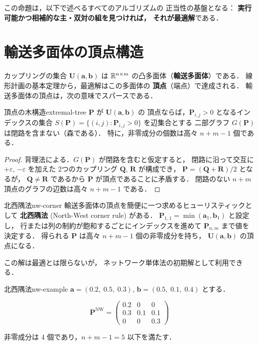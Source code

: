この命題は，以下で述べるすべてのアルゴリズムの
正当性の基盤となる：
\textbf{実行可能かつ相補的な主・双対の組を見つければ，
それが最適解}である．


\section{輸送多面体の頂点構造}\label{sec:transport-polytope}

カップリングの集合 $\mathbf{U}(\mathbf{a}, \mathbf{b})$ は
$\mathbb{R}^{n \times m}$ の凸多面体（\textbf{輸送多面体}）である．
線形計画の基本定理から，最適解はこの多面体の
\textbf{頂点}（端点）で達成される．
輸送多面体の頂点は，次の意味でスパースである．

\begin{proposition}{頂点の木構造}{extremal-tree}
$\mathbf{P}$ が $\mathbf{U}(\mathbf{a}, \mathbf{b})$ の
頂点ならば，$\mathbf{P}_{i,j} > 0$ となるインデックスの集合
$S(\mathbf{P}) = \{(i,j) : \mathbf{P}_{i,j} > 0\}$ を辺集合とする
二部グラフ $G(\mathbf{P})$ は閉路を含まない（森である）．
特に，非零成分の個数は高々 $n + m - 1$ 個である．
\end{proposition}

\begin{proof}
背理法による．$G(\mathbf{P})$ が閉路を含むと仮定すると，
閉路に沿って交互に $+\varepsilon$, $-\varepsilon$ を加えた
2つのカップリング $\mathbf{Q}$, $\mathbf{R}$ が構成でき，
$\mathbf{P} = (\mathbf{Q} + \mathbf{R})/2$ となるが，
$\mathbf{Q} \neq \mathbf{R}$ であるから
$\mathbf{P}$ が頂点であることに矛盾する．
閉路のない $n + m$ 頂点のグラフの辺数は高々 $n + m - 1$ である．
\end{proof}

\begin{remark}{北西隅法}{nw-corner}
輸送多面体の頂点を簡便に一つ求めるヒューリスティックとして
\textbf{北西隅法} (North-West corner rule) がある．
$\mathbf{P}_{1,1} = \min(\mathbf{a}_1, \mathbf{b}_1)$ と設定し，
行または列の制約が飽和するごとにインデックスを進めて
$\mathbf{P}_{n,m}$ まで値を決定する．
得られる $\mathbf{P}$ は高々 $n + m - 1$ 個の非零成分を持ち，
$\mathbf{U}(\mathbf{a}, \mathbf{b})$ の頂点になる．

この解は最適とは限らないが，
ネットワーク単体法の初期解として利用できる．
\end{remark}

\begin{example}{北西隅法}{nw-example}
$\mathbf{a} = (0.2,\; 0.5,\; 0.3)$,
$\mathbf{b} = (0.5,\; 0.1,\; 0.4)$ とする．

\[
  \mathbf{P}^{\mathrm{NW}} =
  \begin{pmatrix}
    0.2 & 0 & 0 \\
    0.3 & 0.1 & 0.1 \\
    0 & 0 & 0.3
  \end{pmatrix}
\]

非零成分は 4 個であり，$n + m - 1 = 5$ 以下を満たす．
\end{example}


